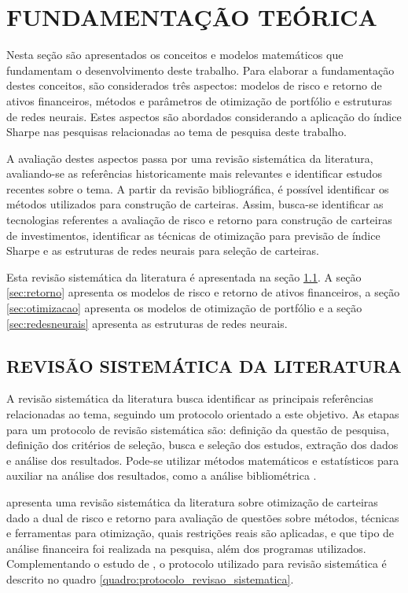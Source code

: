 \section{FUNDAMENTAÇÃO TEÓRICA}

    \ipar Nesta seção são apresentados os conceitos e modelos matemáticos que fundamentam o desenvolvimento deste trabalho. Para elaborar a fundamentação destes conceitos, são considerados três aspectos: modelos de risco e retorno de ativos financeiros, métodos e parâmetros de otimização de portfólio e estruturas de redes neurais. Estes aspectos são abordados considerando a aplicação do índice Sharpe nas pesquisas relacionadas ao tema de pesquisa deste trabalho.
    
    \ipar A avaliação destes aspectos passa por uma revisão sistemática da literatura, avaliando-se as referências historicamente mais relevantes e identificar estudos recentes sobre o tema. A partir da revisão bibliográfica, é possível identificar os métodos utilizados para construção de carteiras. Assim, busca-se identificar as tecnologias referentes a avaliação de risco e retorno para construção de carteiras de investimentos, identificar as técnicas de otimização para previsão de índice Sharpe e as estruturas de redes neurais para seleção de carteiras.

    \ipar Esta revisão sistemática da literatura é apresentada na seção \ref{sec:revisao_sistematica}. A seção \ref{sec:retorno} apresenta os modelos de risco e retorno de ativos financeiros, a seção \ref{sec:otimizacao} apresenta os modelos de otimização de portfólio e a seção \ref{sec:redesneurais} apresenta as estruturas de redes neurais.

    \subsection{REVISÃO SISTEMÁTICA DA LITERATURA}
        \label{sec:revisao_sistematica}

        \ipar A revisão sistemática da literatura busca identificar as principais referências relacionadas ao tema, seguindo um protocolo orientado a este objetivo. As etapas para um protocolo de revisão sistemática são: definição da questão de pesquisa, definição dos critérios de seleção, busca e seleção dos estudos, extração dos dados e análise dos resultados. Pode-se utilizar métodos matemáticos e estatísticos para auxiliar na análise dos resultados, como a análise bibliométrica \cite{yu2018bibliometric}. 
        
        \ipar {} apresenta uma revisão sistemática da literatura sobre otimização de carteiras dado a dual de risco e retorno para avaliação de questões sobre métodos, técnicas e ferramentas para otimização, quais restrições reais são aplicadas, e que tipo de análise financeira foi realizada na pesquisa, além dos programas utilizados. Complementando o estudo de , o protocolo utilizado para revisão sistemática é descrito no quadro \ref{quadro:protocolo_revisao_sistematica}.

